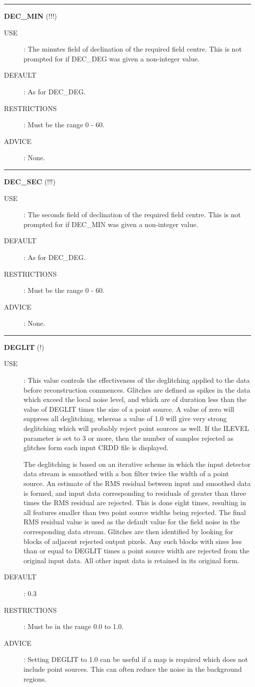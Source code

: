 \rule{\textwidth}{0.3mm}
{\Large {\bf DEC\_MIN} (!!!)}
\begin{description}
\item [USE]:
The minutes field of declination of the required field centre. This is not
prompted for if DEC\_DEG was given a non-integer value.
\item [DEFAULT]:
As for DEC\_DEG.
\item [RESTRICTIONS]:
Must be the range 0 - 60.
\item [ADVICE]:
None.
\end {description}

\rule{\textwidth}{0.3mm}
{\Large {\bf DEC\_SEC} (!!!)}
\begin{description}
\item [USE]:
The seconds field of declination of the required field centre. This is not
prompted for if DEC\_MIN was given a non-integer value.
\item [DEFAULT]:
As for DEC\_DEG.
\item [RESTRICTIONS]:
Must be the range 0 - 60.
\item [ADVICE]:
None.
\end {description}

\rule{\textwidth}{0.3mm}
{\Large {\bf DEGLIT } (!)}
\begin{description}
\item [USE]:
This value controls the effectiveness of the deglitching applied to the data
before reconstruction commences. Glitches are defined as spikes in the
data which exceed the local noise level, and which are of duration less
than the value of DEGLIT times the size of a point source. A value of zero will
suppress all deglitching, whereas a value of 1.0 will give very strong 
deglitching which will probably reject point sources as well. If the ILEVEL 
parameter is set to 3 or more, then the number of samples rejected as glitches 
form each input CRDD file is displayed.

The deglitching is based on an iterative scheme in which the input detector data
stream is smoothed with a box filter twice the width of a point source. An
estimate of the RMS residual between input and smoothed data is formed, and
input data corresponding to residuals of greater than three times the RMS
residual are rejected. This is done eight times, resulting in all features
smaller than two point source widths being rejected. The final RMS residual
value is used as the default value for the field noise in the corresponding data
stream. Glitches are then identified by looking for blocks of adjacent rejected
output pixels. Any such blocks with sizes less than or equal to DEGLIT times a
point source width are rejected from the original input data. All other input
data is retained in its original form. 


\item [DEFAULT]:
0.3
\item [RESTRICTIONS]:
Must be in the range 0.0 to 1.0.
\item [ADVICE]:
Setting DEGLIT to 1.0 can be useful if a map is required which does not
include point sources. This can often reduce the noise in the background 
regions.
\end {description}

